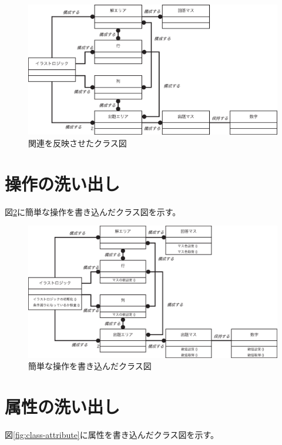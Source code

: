 \documentclass[a4j]{jarticle}
\begin{document}
\begin{figure}[hp]
\centering
\includegraphics[width=15cm]{./image/class-relation.eps}
\caption{関連を反映させたクラス図}
\label{fig:class-relation}
\end{figure}

\section{操作の洗い出し}
図\ref{fig:class-method}に簡単な操作を書き込んだクラス図を示す。

\begin{figure}[hp]
\centering
\includegraphics[width=15cm]{./image/class-method.eps}
\caption{簡単な操作を書き込んだクラス図}
\label{fig:class-method}
\end{figure}

\section{属性の洗い出し}
図\ref{fig:class-attribute}に属性を書き込んだクラス図を示す。
\end{document}
